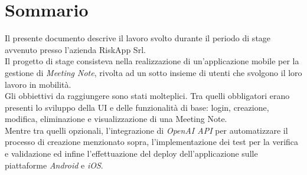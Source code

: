 \cleardoublepage
{}
{}
\begingroup
\let\clearpage\relax
\let\cleardoublepage\relax
\let\cleardoublepage\relax

\chapter*{Sommario}

Il presente documento descrive il lavoro svolto durante il periodo di stage avvenuto presso l'azienda RiskApp Srl. \\

\noindent Il progetto di stage consisteva nella realizzazione di un'applicazione mobile per la gestione di \emph{Meeting Note}, rivolta ad un sotto insieme di utenti che svolgono il loro lavoro in mobilità. \\


\noindent Gli obbiettivi da raggiungere sono stati molteplici. Tra quelli obbligatori erano presenti lo sviluppo della UI e delle funzionalità di base: login, creazione, modifica, eliminazione e visualizzazione di una Meeting Note.\\
Mentre tra quelli opzionali, l'integrazione di \emph{OpenAI API} per automatizzare il processo di creazione menzionato sopra, l'implementazione dei test per la verifica e validazione ed infine l'effettuazione del deploy dell'applicazione sulle piattaforme \emph{Android} e \emph{iOS}.\\




\endgroup

\vfill
